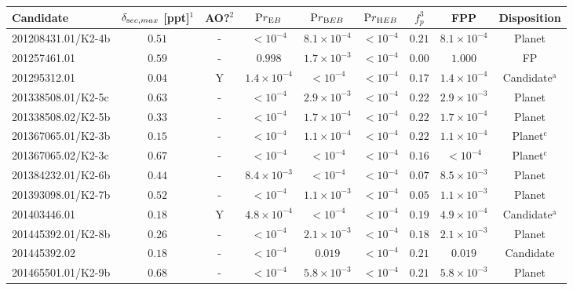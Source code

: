 \begin{landscape}
{\scriptsize
\begin{longtable}{lcccccccc}
\hline
Candidate & $\delta_{\textrm sec, max}$ [ppt]$^1$ & AO?$^2$ & ${\textrm Pr}_{\textrm EB}$ &
${\textrm Pr}_{\textrm BEB}$ & ${\textrm Pr}_{\textrm HEB}$ & $f_p^3$ & FPP & Disposition \\
\hline
201208431.01/K2-4b & $0.51$ &  - & $< 10^{-4}$ & $8.1\times10^{-4}$ & $< 10^{-4}$ & $0.21$ & $8.1\times10^{-4}$ & Planet  \\
 \color{red} 201257461.01  & \color{red}  $0.59$  & \color{red}   -  & \color{red}  $0.998$  & \color{red}  $1.7\times10^{-3}$  & \color{red}  $< 10^{-4}$  & \color{red}  $0.00$  & \color{red}  $1.000$  & \color{red}  FP \\
201295312.01 & $0.04$ &  Y & $1.4\times10^{-4}$ & $< 10^{-4}$ & $< 10^{-4}$ & $0.17$ & $1.4\times10^{-4}$ & Candidate$^{\textrm{a}}$  \\
201338508.01/K2-5c & $0.63$ &  - & $< 10^{-4}$ & $2.9\times10^{-3}$ & $< 10^{-4}$ & $0.22$ & $2.9\times10^{-3}$ & Planet  \\
201338508.02/K2-5b & $0.33$ &  - & $< 10^{-4}$ & $1.7\times10^{-4}$ & $< 10^{-4}$ & $0.22$ & $1.7\times10^{-4}$ & Planet  \\
201367065.01/K2-3b & $0.15$ &  - & $< 10^{-4}$ & $1.1\times10^{-4}$ & $< 10^{-4}$ & $0.22$ & $1.1\times10^{-4}$ & Planet$^{\textrm{c}}$  \\
201367065.02/K2-3c & $0.67$ &  - & $< 10^{-4}$ & $< 10^{-4}$ & $< 10^{-4}$ & $0.16$ & $< 10^{-4}$ & Planet$^{\textrm{c}}$  \\
201384232.01/K2-6b & $0.44$ &  - & $8.4\times10^{-3}$ & $< 10^{-4}$ & $< 10^{-4}$ & $0.07$ & $8.5\times10^{-3}$ & Planet  \\
201393098.01/K2-7b & $0.52$ &  - & $< 10^{-4}$ & $1.1\times10^{-3}$ & $< 10^{-4}$ & $0.05$ & $1.1\times10^{-3}$ & Planet  \\
201403446.01 & $0.18$ &  Y & $4.8\times10^{-4}$ & $< 10^{-4}$ & $< 10^{-4}$ & $0.19$ & $4.9\times10^{-4}$ & Candidate$^{\textrm{a}}$  \\
201445392.01/K2-8b & $0.26$ &  - & $< 10^{-4}$ & $2.1\times10^{-3}$ & $< 10^{-4}$ & $0.18$ & $2.1\times10^{-3}$ & Planet  \\
201445392.02 & $0.18$ &  - & $< 10^{-4}$ & $0.019$ & $< 10^{-4}$ & $0.21$ & $0.019$ & Candidate  \\
201465501.01/K2-9b & $0.68$ &  - & $< 10^{-4}$ & $5.8\times10^{-3}$ & $< 10^{-4}$ & $0.21$ & $5.8\times10^{-3}$ & Planet  \\

\end{longtable}}
\end{landscape}
